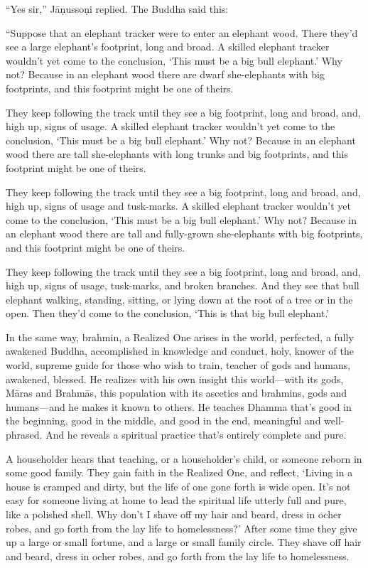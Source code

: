 \documentclass[12pt,openany]{book}%
\begin{document}
“Yes sir,” \textsanskrit{Jāṇussoṇi} replied. The Buddha said this: 

“Suppose that an elephant tracker were to enter an elephant wood. There they’d see a large elephant’s footprint, long and broad. A skilled elephant tracker wouldn’t yet come to the conclusion, ‘This must be a big bull elephant.’ Why not? Because in an elephant wood there are dwarf she-elephants with big footprints, and this footprint might be one of theirs. 

They keep following the track until they see a big footprint, long and broad, and, high up, signs of usage. A skilled elephant tracker wouldn’t yet come to the conclusion, ‘This must be a big bull elephant.’ Why not? Because in an elephant wood there are tall she-elephants with long trunks and big footprints, and this footprint might be one of theirs. 

They keep following the track until they see a big footprint, long and broad, and, high up, signs of usage and tusk-marks. A skilled elephant tracker wouldn’t yet come to the conclusion, ‘This must be a big bull elephant.’ Why not? Because in an elephant wood there are tall and fully-grown she-elephants with big footprints, and this footprint might be one of theirs. 

They keep following the track until they see a big footprint, long and broad, and, high up, signs of usage, tusk-marks, and broken branches. And they see that bull elephant walking, standing, sitting, or lying down at the root of a tree or in the open. Then they’d come to the conclusion, ‘This is that big bull elephant.’ 

In the same way, brahmin, a Realized One arises in the world, perfected, a fully awakened Buddha, accomplished in knowledge and conduct, holy, knower of the world, supreme guide for those who wish to train, teacher of gods and humans, awakened, blessed. He realizes with his own insight this world—with its gods, \textsanskrit{Māras} and \textsanskrit{Brahmās}, this population with its ascetics and brahmins, gods and humans—and he makes it known to others. He teaches Dhamma that’s good in the beginning, good in the middle, and good in the end, meaningful and well-phrased. And he reveals a spiritual practice that’s entirely complete and pure. 

A householder hears that teaching, or a householder’s child, or someone reborn in some good family. They gain faith in the Realized One, and reflect, ‘Living in a house is cramped and dirty, but the life of one gone forth is wide open. It’s not easy for someone living at home to lead the spiritual life utterly full and pure, like a polished shell. Why don’t I shave off my hair and beard, dress in ocher robes, and go forth from the lay life to homelessness?’ After some time they give up a large or small fortune, and a large or small family circle. They shave off hair and beard, dress in ocher robes, and go forth from the lay life to homelessness. 
\end{document}

